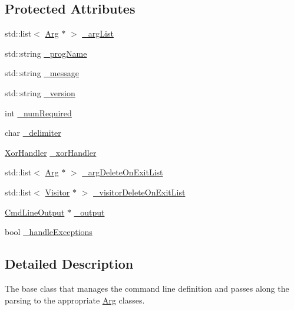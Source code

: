 \subsection*{Protected Attributes}
\begin{DoxyCompactItemize}
\item 
std\+::list$<$ \hyperlink{class_t_c_l_a_p_1_1_arg}{Arg} $\ast$ $>$ \hyperlink{class_t_c_l_a_p_1_1_cmd_line_a4d70f73542d8184e077688bff3801baf}{\+\_\+arg\+List}
\item 
std\+::string \hyperlink{class_t_c_l_a_p_1_1_cmd_line_a8b856dadc54fa30d0dddba4588ef9344}{\+\_\+prog\+Name}
\item 
std\+::string \hyperlink{class_t_c_l_a_p_1_1_cmd_line_a3ccd2ae40f6eb97aebca3de9a02f10cf}{\+\_\+message}
\item 
std\+::string \hyperlink{class_t_c_l_a_p_1_1_cmd_line_a2b2b52fffed2dcb7df3cdfc582ec8fd1}{\+\_\+version}
\item 
int \hyperlink{class_t_c_l_a_p_1_1_cmd_line_a2285207b528d5fad18c82a2ee8155f37}{\+\_\+num\+Required}
\item 
char \hyperlink{class_t_c_l_a_p_1_1_cmd_line_a602e65692dc07ea872134f354026a54f}{\+\_\+delimiter}
\item 
\hyperlink{class_t_c_l_a_p_1_1_xor_handler}{Xor\+Handler} \hyperlink{class_t_c_l_a_p_1_1_cmd_line_a33846aa10c62ecd61640c93c16ac315d}{\+\_\+xor\+Handler}
\item 
std\+::list$<$ \hyperlink{class_t_c_l_a_p_1_1_arg}{Arg} $\ast$ $>$ \hyperlink{class_t_c_l_a_p_1_1_cmd_line_af8d37fbf9d0b60b6acbd737af380f3e5}{\+\_\+arg\+Delete\+On\+Exit\+List}
\item 
std\+::list$<$ \hyperlink{class_t_c_l_a_p_1_1_visitor}{Visitor} $\ast$ $>$ \hyperlink{class_t_c_l_a_p_1_1_cmd_line_a79b8a947f8100de977574b45b91117ac}{\+\_\+visitor\+Delete\+On\+Exit\+List}
\item 
\hyperlink{class_t_c_l_a_p_1_1_cmd_line_output}{Cmd\+Line\+Output} $\ast$ \hyperlink{class_t_c_l_a_p_1_1_cmd_line_a5152bf4ef26217583a3bc708aa0ea83e}{\+\_\+output}
\item 
bool \hyperlink{class_t_c_l_a_p_1_1_cmd_line_a3609d0c13886053b367d1df80efbe67b}{\+\_\+handle\+Exceptions}
\end{DoxyCompactItemize}


\subsection{Detailed Description}
The base class that manages the command line definition and passes along the parsing to the appropriate \hyperlink{class_t_c_l_a_p_1_1_arg}{Arg} classes. 

